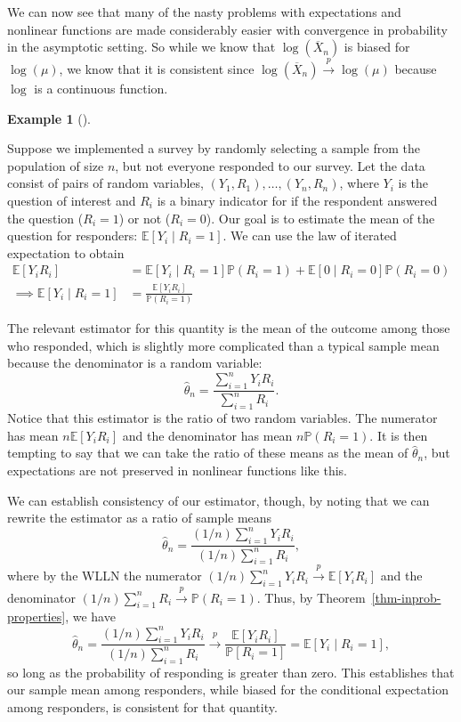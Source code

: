 \documentclass[
  letterpaper,
  DIV=11,
  numbers=noendperiod]{scrreprt}
\newcommand{\E}{\mathbb{E}}
\renewcommand{\P}{\mathbb{P}}
\newcommand{\Xbar}{\overline{X}}
\newcommand{\inprob}{\overset{p}{\to}}
\theoremstyle{definition}
\newtheorem{example}{Example}[chapter]
\theoremstyle{definition}
\theoremstyle{plain}
\theoremstyle{remark}
\begin{document}
We can now see that many of the nasty problems with expectations and
nonlinear functions are made considerably easier with convergence in
probability in the asymptotic setting. So while we know that
\(\log(\Xbar_n)\) is biased for \(\log(\mu)\), we know that it is
consistent since \(\log(\Xbar_n) \inprob \log(\mu)\) because \(\log\) is
a continuous function.

\begin{example}[]\protect\hypertarget{exm-nonresponse}{}\label{exm-nonresponse}

Suppose we implemented a survey by randomly selecting a sample from the
population of size \(n\), but not everyone responded to our survey. Let
the data consist of pairs of random variables,
\((Y_1, R_1), \ldots, (Y_n, R_n)\), where \(Y_i\) is the question of
interest and \(R_i\) is a binary indicator for if the respondent
answered the question (\(R_i = 1\)) or not (\(R_i = 0\)). Our goal is to
estimate the mean of the question for responders:
\(\E[Y_i \mid R_i = 1]\). We can use the law of iterated expectation to
obtain \[
\begin{aligned}
\E[Y_iR_i] &= \E[Y_i \mid R_i = 1]\P(R_i = 1) + \E[ 0 \mid R_i = 0]\P(R_i = 0) \\
\implies \E[Y_i \mid R_i = 1] &= \frac{\E[Y_iR_i]}{\P(R_i = 1)}
\end{aligned}
\]

The relevant estimator for this quantity is the mean of the outcome
among those who responded, which is slightly more complicated than a
typical sample mean because the denominator is a random variable: \[
\widehat{\theta}_n = \frac{\sum_{i=1}^n Y_iR_i}{\sum_{i=1}^n R_i}. 
\] Notice that this estimator is the ratio of two random variables. The
numerator has mean \(n\E[Y_iR_i]\) and the denominator has mean
\(n\P(R_i = 1)\). It is then tempting to say that we can take the ratio
of these means as the mean of \(\widehat{\theta}_n\), but expectations
are not preserved in nonlinear functions like this.

We can establish consistency of our estimator, though, by noting that we
can rewrite the estimator as a ratio of sample means \[
\widehat{\theta}_n = \frac{(1/n)\sum_{i=1}^n Y_iR_i}{(1/n)\sum_{i=1}^n R_i},
\] where by the WLLN the numerator
\((1/n)\sum_{i=1}^n Y_iR_i \inprob \E[Y_iR_i]\) and the denominator
\((1/n)\sum_{i=1}^n R_i \inprob \P(R_i = 1)\). Thus, by
Theorem~\ref{thm-inprob-properties}, we have \[
\widehat{\theta}_n = \frac{(1/n)\sum_{i=1}^n Y_iR_i}{(1/n)\sum_{i=1}^n R_i} \inprob \frac{\E[Y_iR_i]}{\P[R_i = 1]} = \E[Y_i \mid R_i = 1],
\] so long as the probability of responding is greater than zero. This
establishes that our sample mean among responders, while biased for the
conditional expectation among responders, is consistent for that
quantity.

\end{example}
\end{document}
